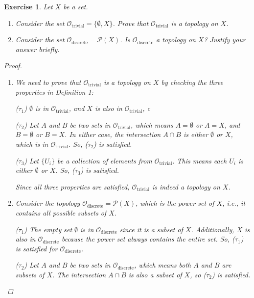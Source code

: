 \documentclass{article}
\newtheorem{exercise}{Exercise}
\begin{document}
\begin{exercise}
      Let $X$ be a set.
    \begin{enumerate}
    
    \item Consider the set $\mathcal{O}_{\text{trivial}} = \{\emptyset, X\}$. Prove that $\mathcal{O}_{\text{trivial}}$ is a topology on $X$.\\

    \item Consider the set $\mathcal{O}_{\text{discrete}} = \mathcal{P}(X)$. Is $\mathcal{O}_{\text{discrete}}$ a topology on $X$? Justify your answer briefly.
    \end{enumerate}

    \begin{proof}
    \begin{enumerate}
         
        \item We need to prove that $\mathcal{O}_{\text{trivial}}$ is a topology on $X$ by checking the three properties in Definition 1:

    ($\tau_1$) $\emptyset$ is in $\mathcal{O}_{\text{trivial}}$, and $X$ is also in $\mathcal{O}_{\text{trivial}}$, c

    ($\tau_2$) Let $A$ and $B$ be two sets in $\mathcal{O}_{\text{trivial}}$, which means $A=\emptyset$ or $A=X$, and $B=\emptyset$ or $B=X$. In either case, the intersection $A \cap B$ is either $\emptyset$ or $X$, which is in $\mathcal{O}_{\text{trivial}}$. So, ($\tau_2$) is satisfied.

    ($\tau_3$) Let $\{U_i\}$ be a collection of elements from $\mathcal{O}_{\text{trivial}}$. This means each $U_i$ is either $\emptyset$ or $X$. 
So, ($\tau_3$) is satisfied.

Since all three properties are satisfied, $\mathcal{O}_{\text{trivial}}$ is indeed a topology on $X$.


    \item Consider the topology $\mathcal{O}_{\text{discrete}} = \mathcal{P}(X)$, which is the power set of $X$, i.e., it contains all possible subsets of $X$.

($\tau_1$) The empty set $\emptyset$ is in $\mathcal{O}_{\text{discrete}}$ since it is a subset of $X$. Additionally, $X$ is also in $\mathcal{O}_{\text{discrete}}$ because the power set always contains the entire set. So, ($\tau_1$) is satisfied for $\mathcal{O}_{\text{discrete}}$.

($\tau_2$) Let $A$ and $B$ be two sets in $\mathcal{O}_{\text{discrete}}$, which means both $A$ and $B$ are subsets of $X$. The intersection $A \cap B$ is also a subset of $X$, so ($\tau_2$) is satisfied.


\end{enumerate}
\end{proof}
\end{exercise}
\end{document}
